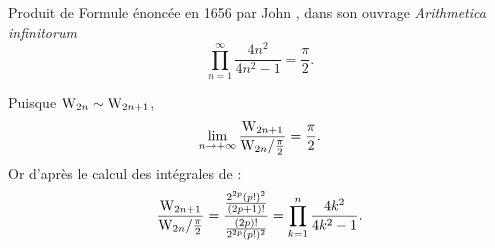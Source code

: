 \begin{prop}{Produit de }
    Formule énoncée en 1656 par John , dans son ouvrage \emph{Arithmetica infinitorum}
    $$\prod_{n=1}^{\infty} \frac{4n^2}{4n^2-1} = \frac{\pi}{2}.$$
\end{prop}

\begin{demo}
    Puisque $\mathrm{W}_{2n} \sim \mathrm{W}_{2n+1}$, 
    $$\lim_{n \to +\infty} \frac{\mathrm{W}_{2n+1}}{\mathrm{W}_{2n} / \frac{\pi}{2}} = \frac{\pi}{2}.$$
    Or d'après le calcul des intégrales de :
    $$\frac{\mathrm{W}_{2n+1}}{\mathrm{W}_{2n} / \frac{\pi}{2}} = \frac{\frac{2^{2p}(p!)^2}{(2p+1)!}}{\frac{(2p)!}{2^{2p}(p!)^2}} = \prod_{k=1}^n \frac{4k^2}{4k^2-1}.$$
\end{demo}









